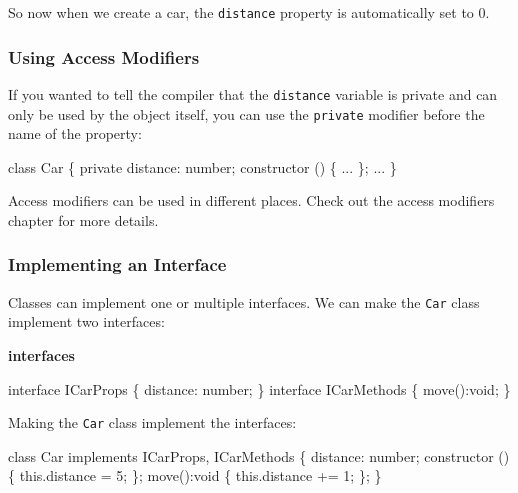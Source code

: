 \documentclass[12pt,]{article}
\newenvironment{Shaded}{}{}
\newcommand{\KeywordTok}[1]{\textcolor[rgb]{0.00,0.00,1.00}{{#1}}}
\newcommand{\DataTypeTok}[1]{{#1}}
\newcommand{\DecValTok}[1]{{#1}}
\newcommand{\FunctionTok}[1]{{#1}}
\newcommand{\NormalTok}[1]{{#1}}
\begin{document}
So now when we create a car, the \texttt{distance} property is
automatically set to 0.

\subsubsection{Using Access Modifiers}\label{using-access-modifiers}

If you wanted to tell the compiler that the \texttt{distance} variable
is private and can only be used by the object itself, you can use the
\texttt{private} modifier before the name of the property:

\begin{Shaded}
\begin{Highlighting}[numbers=left,,]
\KeywordTok{class} \NormalTok{Car \{}
  \KeywordTok{private} \NormalTok{distance: number;}
  \FunctionTok{constructor} \NormalTok{() \{}
    \NormalTok{...}
  \NormalTok{\};}
  \NormalTok{...}
\NormalTok{\}}
\end{Highlighting}
\end{Shaded}

Access modifiers can be used in different places. Check out the access
modifiers chapter for more details.

\subsubsection{Implementing an
Interface}\label{implementing-an-interface}

Classes can implement one or multiple interfaces. We can make the
\texttt{Car} class implement two interfaces:

\textbf{interfaces}

\begin{Shaded}
\begin{Highlighting}[numbers=left,,]
\KeywordTok{interface} \NormalTok{ICarProps \{}
  \NormalTok{distance: number;}
\NormalTok{\}}
\KeywordTok{interface} \NormalTok{ICarMethods \{}
  \FunctionTok{move}\NormalTok{():}\DataTypeTok{void}\NormalTok{;}
\NormalTok{\}}
\end{Highlighting}
\end{Shaded}

Making the \texttt{Car} class implement the interfaces:

\begin{Shaded}
\begin{Highlighting}[numbers=left,,]
\KeywordTok{class} \NormalTok{Car }\KeywordTok{implements} \NormalTok{ICarProps, ICarMethods \{}
  \NormalTok{distance: number;}
  \FunctionTok{constructor} \NormalTok{() \{}
    \KeywordTok{this}\NormalTok{.}\FunctionTok{distance} \NormalTok{= }\DecValTok{5}\NormalTok{;}
  \NormalTok{\};}
  \FunctionTok{move}\NormalTok{():}\DataTypeTok{void} \NormalTok{\{}
    \KeywordTok{this}\NormalTok{.}\FunctionTok{distance} \NormalTok{+= }\DecValTok{1}\NormalTok{;}
  \NormalTok{\};}
\NormalTok{\}}
\end{Highlighting}
\end{Shaded}
\end{document}
